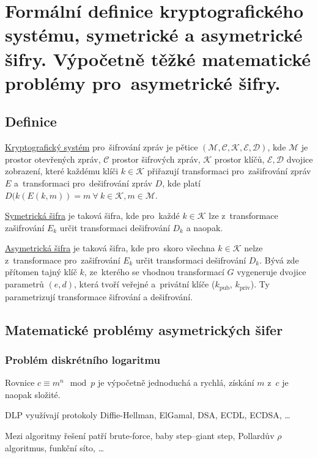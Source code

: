\section{Formální definice kryptografického systému, symetrické a asymetrické šifry. Výpočetně těžké matematické problémy pro~asymetrické šifry.}

\subsection{Definice}

\uline{Kryptografický systém} pro~šifrování zpráv je pětice $(\mathcal{M}, \mathcal{C}, \mathcal{K}, \mathcal{E}, \mathcal{D})$, kde
$\mathcal{M}$ je prostor otevřených zpráv,
$\mathcal{C}$ prostor šifrových zpráv,
$\mathcal{K}$ prostor klíčů,
$\mathcal{E}, \mathcal{D}$ dvojice zobrazení, které každému klíči $k \in \mathcal{K}$ přiřazují transformaci pro~zašifrování zpráv $E$ a~transformaci pro~dešifrování zpráv $D$, kde platí $D(k(E(k,m))=m \ \forall \ k \in \mathcal{K}, m \in \mathcal{M}$.

\uline{Symetrická šifra} je taková šifra, kde pro~každé $k \in \mathcal{K}$ lze z~transformace zašifrování $E_k$ určit transformaci dešifrování $D_k$ a naopak.

\uline{Asymetrická šifra} je taková šifra, kde pro~skoro všechna $k \in \mathcal{K}$ nelze z~transformace pro~zašifrování $E_k$ určit transformaci dešifrování $D_k$.
Bývá zde přítomen tajný klíč $k$, ze~kterého se vhodnou transformací $G$ vygeneruje dvojice parametrů $(e, d)$, která tvoří veřejné a~privátní klíče ($k_\text{pub}$, $k_\text{priv}$).
Ty parametrizují transformace šifrování a dešifrování.

\subsection{Matematické problémy asymetrických šifer}

\subsubsection{Problém diskrétního logaritmu}

Rovnice $c \equiv m^n \mod p$ je výpočetně jednoduchá a rychlá, získání $m$ z~$c$ je naopak složité.

DLP využívají protokoly Diffie-Hellman, ElGamal, DSA, ECDL, ECDSA, \dots

Mezi algoritmy řešení patří brute-force, baby step--giant step, Pollardův $\rho$ algoritmus, funkční síto, \dots

